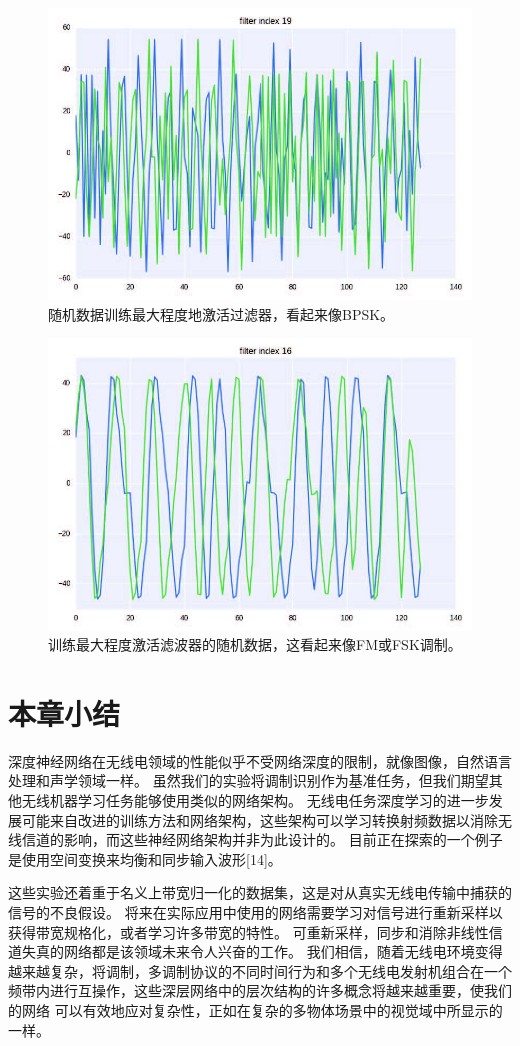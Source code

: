 \begin{figure}[!h]
	\centering
	\includegraphics[scale=1]{figures/chapter_5/fig9_b}
	\caption{随机数据训练最大程度地激活过滤器，看起来像BPSK。}
\end{figure}
\begin{figure}[!h]
	\centering
	\includegraphics[scale=1]{figures/chapter_5/fig10_b}
	\caption{训练最大程度激活滤波器的随机数据，这看起来像FM或FSK调制。}
\end{figure}


\section{本章小结}
深度神经网络在无线电领域的性能似乎不受网络深度的限制，就像图像，自然语言处理和声学领域一样。 虽然我们的实验将调制识别作为基准任务，但我们期望其他无线机器学习任务能够使用类似的网络架构。 无线电任务深度学习的进一步发展可能来自改进的训练方法和网络架构，这些架构可以学习转换射频数据以消除无线信道的影响，而这些神经网络架构并非为此设计的。 目前正在探索的一个例子是使用空间变换来均衡和同步输入波形[14]。\par

这些实验还着重于名义上带宽归一化的数据集，这是对从真实无线电传输中捕获的信号的不良假设。 将来在实际应用中使用的网络需要学习对信号进行重新采样以获得带宽规格化，或者学习许多带宽的特性。 可重新采样，同步和消除非线性信道失真的网络都是该领域未来令人兴奋的工作。 我们相信，随着无线电环境变得越来越复杂，将调制，多调制协议的不同时间行为和多个无线电发射机组合在一个频带内进行互操作，这些深层网络中的层次结构的许多概念将越来越重要，使我们的网络 可以有效地应对复杂性，正如在复杂的多物体场景中的视觉域中所显示的一样。\par